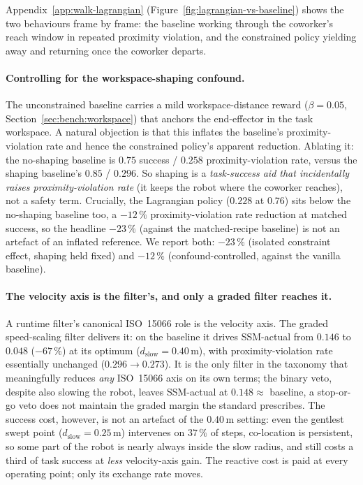 \documentclass[11pt,a4paper]{report}
\newcommand{\ssm}{SSM}
\newcommand{\iso}{ISO~15066}
\begin{document}
Appendix~\ref{app:walk-lagrangian}
(Figure~\ref{fig:lagrangian-vs-baseline}) shows the two behaviours
frame by frame: the baseline working through the coworker's reach
window in repeated proximity violation, and the constrained policy
yielding away and returning once the coworker departs.

\paragraph{Controlling for the workspace-shaping confound.}
The unconstrained baseline carries a mild workspace-distance reward
($\beta = 0.05$, Section~\ref{sec:bench:workspace}) that anchors the
end-effector in the task workspace. A natural objection is that this
inflates the baseline's proximity-violation rate and hence the constrained policy's apparent
reduction. Ablating it: the no-shaping baseline is $0.75$ success /
$0.258$ proximity-violation rate, versus the shaping baseline's $0.85$ / $0.296$. So
shaping is a \emph{task-success aid that incidentally raises
proximity-violation rate} (it keeps the robot where the coworker reaches), not a
safety term. Crucially, the Lagrangian policy ($0.228$ at $0.76$) sits
below the no-shaping baseline too, a $-12\,\%$ proximity-violation
rate reduction at
matched success, so the headline $-23\,\%$ (against the matched-recipe
baseline) is not an artefact of an inflated reference. We report both:
$-23\,\%$ (isolated constraint effect, shaping held fixed) and
$-12\,\%$ (confound-controlled, against the vanilla baseline).

\paragraph{The velocity axis is the filter's, and only a graded filter
reaches it.}
A runtime filter's canonical \iso{} role is the velocity axis. The
graded speed-scaling filter delivers it: on the baseline it drives
\ssm{}-actual from $0.146$ to $0.048$ ($-67\,\%$) at its optimum
($d_{\mathrm{slow}} = 0.40$\,m), with proximity-violation rate essentially unchanged
($0.296 \rightarrow 0.273$). It is the only filter in the taxonomy
that meaningfully reduces \emph{any} \iso{} axis on its own terms;
the binary veto, despite also slowing the robot, leaves
\ssm{}-actual at $0.148 \approx$ baseline, a stop-or-go veto does not
maintain the graded margin the standard prescribes. The success
cost, however, is not an artefact of the $0.40$\,m setting: even the
gentlest swept point ($d_{\mathrm{slow}} = 0.25$\,m) intervenes on
$37\,\%$ of steps, co-location is persistent, so some part of the
robot is nearly always inside the slow radius, and still costs a
third of task success at \emph{less} velocity-axis gain. The
reactive cost is paid at every operating point; only its exchange
rate moves.
\end{document}

